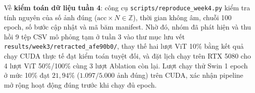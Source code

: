Về \textbf{kiểm toán dữ liệu tuần 4}: công cụ \texttt{scripts/reproduce\_week4.py} kiểm tra tính nguyên của số ảnh đúng ($\text{acc}\times N \in \mathbb{Z}$), thời gian không âm, chuỗi 100 epoch, số bước cập nhật và mã băm manifest. Nhờ đó, nhóm đã phát hiện và thu hồi 9 tệp CSV mô phỏng tạm ở tuần 3 vào thư mục lưu vết \texttt{results/week3/retracted\_afe90b0/}, thay thế hai lượt ViT 10\% bằng kết quả chạy CUDA thực tế đạt kiểm toán tuyệt đối, và đặt lịch chạy trên RTX 5080 cho 4 lượt ViT 50\%/100\% cùng 3 lượt Ablation còn lại. Lượt chạy thử Swin 1 epoch ở mức 10\% đạt $21{,}94\%$ ($1.097/5.000$ ảnh đúng) trên CUDA, xác nhận pipeline mở rộng hoạt động đúng trước khi chạy đủ epoch.
